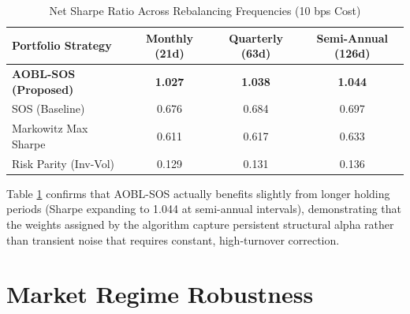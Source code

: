 \documentclass[11pt,a4paper]{article}
\begin{document}
\begin{table}[htbp]
\centering
\caption{Net Sharpe Ratio Across Rebalancing Frequencies (10 bps Cost)}
\label{tab:rebal_sensitivity}
\begin{tabular}{lccc}
\toprule
\textbf{Portfolio Strategy} & \textbf{Monthly (21d)} & \textbf{Quarterly (63d)} & \textbf{Semi-Annual (126d)} \\
\midrule
\textbf{AOBL-SOS (Proposed)} & \textbf{1.027} & \textbf{1.038} & \textbf{1.044} \\
SOS (Baseline) & 0.676 & 0.684 & 0.697 \\
Markowitz Max Sharpe & 0.611 & 0.617 & 0.633 \\
Risk Parity (Inv-Vol) & 0.129 & 0.131 & 0.136 \\
\bottomrule
\end{tabular}
\end{table}

Table \ref{tab:rebal_sensitivity} confirms that AOBL-SOS actually benefits slightly from longer holding periods (Sharpe expanding to 1.044 at semi-annual intervals), demonstrating that the weights assigned by the algorithm capture persistent structural alpha rather than transient noise that requires constant, high-turnover correction.

\section{Market Regime Robustness}

\begin{table}[htbp]
\centering
\caption{Walk-Forward Expanding Window Validation (Net Sharpe Ratios)}
\label{tab:walk_forward}
\end{table}
\end{document}

